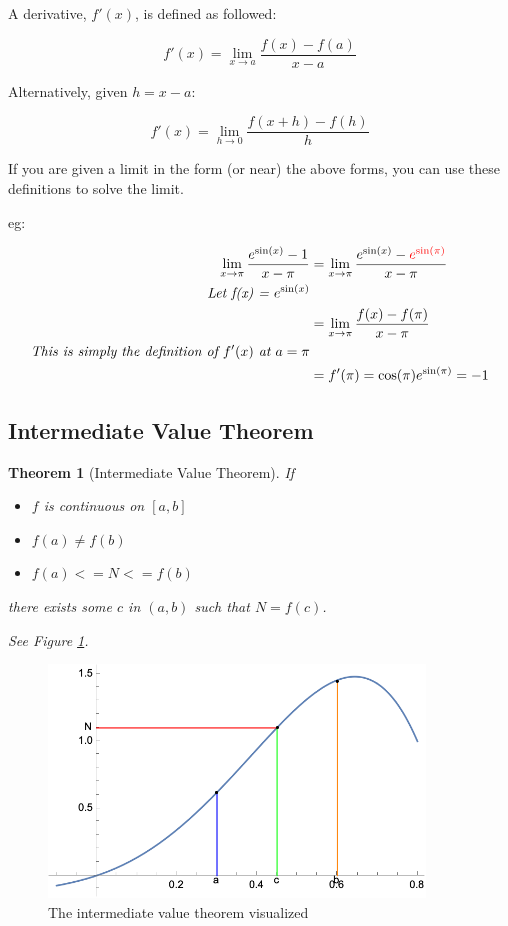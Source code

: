 \documentclass[12pt]{article}
\newtheorem*{theorem}{Theorem}
\begin{document}
A derivative, $f'(x)$, is defined as followed:

$$f'(x) = \lim_{x\to a}\frac{f(x)-f(a)}{x-a}$$

Alternatively, given $h = x-a$:

$$f'(x) = \lim_{h\to 0} \frac{f(x+h)-f(h)}{h}$$

If you are given a limit in the form (or near) the above forms, you can use these definitions to solve the limit. 

eg: 

\begin{equation}
    \begin{split}
    \lim_{x\to \pi}\frac{e^{\sin(x)} - 1}{x - \pi} &= \lim_{x\to \pi}\frac{e^{\sin(x)} - \textcolor{red}{e^{\sin(\pi)}}}{x - \pi}\\
    \textit{Let f(x) = $e^{\sin(x)}$}\\
    &=\lim_{x\to \pi}\frac{f(x)-f(\pi)}{x - \pi}\\
    \textit{This is simply the definition of $f'(x)$ at $a=\pi$}\\
    &=f'(\pi) = \cos(\pi)e^{\sin(\pi)} = -1
    \end{split}
\end{equation}

\subsection{Intermediate Value Theorem}
\begin{theorem}[Intermediate Value Theorem]
    If
    \begin{itemize}
        \item $f$ is continuous on $[a,b]$
        \item $f(a) \neq f(b)$
        \item $f(a) <= N <= f(b)$
    \end{itemize}

    there exists some $c$ in $(a,b)$ such that $N = f(c)$.
    
    See Figure \ref{ivt}.
\end{theorem}
\begin{figure}[!ht]
    \centering
    \includegraphics[width=10.0cm]{misc/imvt.png}
    \caption{The intermediate value theorem visualized}
    \label{ivt}
\end{figure}
\end{document}
